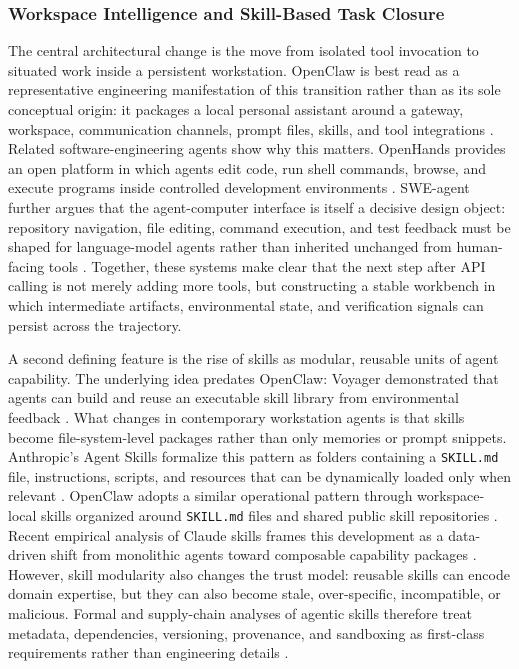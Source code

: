 \subsubsection{Workspace Intelligence and Skill-Based Task Closure}



The central architectural change is the move from isolated tool invocation to situated work inside a persistent workstation.
OpenClaw is best read as a representative engineering manifestation of this transition rather than as its sole conceptual origin: it packages a local personal assistant around a gateway, workspace, communication channels, prompt files, skills, and tool integrations \cite{openclaw2026repo}.
Related software-engineering agents show why this matters.
OpenHands provides an open platform in which agents edit code, run shell commands, browse, and execute programs inside controlled development environments \cite{wang2024openhands}.
SWE-agent further argues that the agent-computer interface is itself a decisive design object: repository navigation, file editing, command execution, and test feedback must be shaped for language-model agents rather than inherited unchanged from human-facing tools \cite{yang2024sweagent}.
Together, these systems make clear that the next step after API calling is not merely adding more tools, but constructing a stable workbench in which intermediate artifacts, environmental state, and verification signals can persist across the trajectory.



A second defining feature is the rise of skills as modular, reusable units of agent capability.
The underlying idea predates OpenClaw: Voyager demonstrated that agents can build and reuse an executable skill library from environmental feedback \cite{wang2023voyager}.
What changes in contemporary workstation agents is that skills become file-system-level packages rather than only memories or prompt snippets.
Anthropic's Agent Skills formalize this pattern as folders containing a \texttt{SKILL.md} file, instructions, scripts, and resources that can be dynamically loaded only when relevant \cite{anthropic2026skillsdocs,anthropic2026skillsrepo}.
OpenClaw adopts a similar operational pattern through workspace-local skills organized around \texttt{SKILL.md} files and shared public skill repositories \cite{openclaw2026skillsdocs,openclaw2026skillsrepo,voltagent2026awesomeopenclawskills}.
Recent empirical analysis of Claude skills frames this development as a data-driven shift from monolithic agents toward composable capability packages \cite{ling2026agentskills}.
However, skill modularity also changes the trust model: reusable skills can encode domain expertise, but they can also become stale, over-specific, incompatible, or malicious.
Formal and supply-chain analyses of agentic skills therefore treat metadata, dependencies, versioning, provenance, and sandboxing as first-class requirements rather than engineering details \cite{bhardwaj2026skillfortify}.


